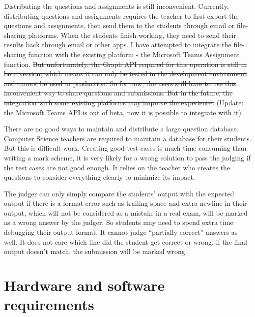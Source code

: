 \documentclass[a4paper]{report}
\begin{document}
Distributing the questions and assignments is still inconvenient. Currently, distributing questions and assignments requires the teacher to first export the questions and assignments, then send them to the students through email or file-sharing platforms. When the students finish working, they need to send their results back through email or other apps. I have attempted to integrate the file-sharing function with the existing platform - the Microsoft Teams Assignment function. \sout{But unfortunately, the Graph API required for this operation is still in beta version, which means it can only be tested in the development environment and cannot be used in production. So for now, the users still have to use this inconvenient way to share questions and submissions. But in the future, the integration with some existing platforms may improve the experience.} (Update: the Microsoft Teams API is out of beta, now it is possible to integrate with it)

There are no good ways to maintain and distribute a large question database. Computer Science teachers are required to maintain a database for their students. But this is difficult work. Creating good test cases is much time consuming than writing a mark scheme, it is very likely for a wrong solution to pass the judging if the test cases are not good enough. It relies on the teacher who creates the questions to consider everything clearly to minimize its impact.

The judger can only simply compare the students' output with the expected output if there is a format error such as trailing space and extra newline in their output, which will not be considered as a mistake in a real exam, will be marked as a wrong answer by the judger. So students may need to spend extra time debugging their output format. It cannot judge ``partially correct'' answers as well. It does not care which line did the student get correct or wrong, if the final output doesn't match, the submission will be marked wrong.

\section{Hardware and software requirements}
\end{document}
